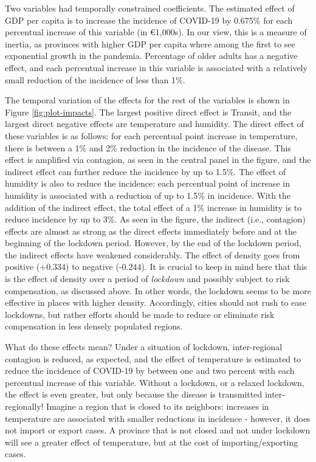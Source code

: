 \documentclass[]{elsarticle} %
\begin{document}
Two variables had temporally constrained coefficients. The estimated
effect of GDP per capita is to increase the incidence of COVID-19 by
0.675\% for each percentual increase of this variable (in €1,000s). In
our view, this is a measure of inertia, as provinces with higher GDP per
capita where among the first to see exponential growth in the pandemia.
Percentage of older adults has a negative effect, and each percentual
increase in this variable is associated with a relatively small
reduction of the incidence of less than 1\%.

The temporal variation of the effects for the rest of the variables is
shown in Figure \ref{fig:plot-impacts}. The largest positive direct
effect is Transit, and the largest direct negative effects are
temperature and humidity. The direct effect of these variables is as
follows: for each percentual point increase in temperature, there is
between a 1\% and 2\% reduction in the incidence of the disease. This
effect is amplified via contagion, as seen in the central panel in the
figure, and the indirect effect can further reduce the incidence by up
to 1.5\%. The effect of humidity is also to reduce the incidence: each
percentual point of increase in humidity is associated with a reduction
of up to 1.5\% in incidence. With the addition of the indirect effect,
the total effect of a 1\% increase in humidity is to reduce incidence by
up to 3\%. As seen in the figure, the indirect (i.e., contagion) effects
are almost as strong as the direct effects immediately before and at the
beginning of the lockdown period. However, by the end of the lockdown
period, the indirect effects have weakened considerably. The effect of
density goes from positive (+0.334) to negative (-0.244). It is crucial
to keep in mind here that this is the effect of density over a period of
\emph{lockdown} and possibly subject to risk compensation, as discussed
above. In other words, the lockdown seems to be more effective in places
with higher density. Accordingly, cities should not rush to ease
lockdowns, but rather efforts should be made to reduce or eliminate risk
compensation in less densely populated regions.

What do these effects mean? Under a situation of lockdown,
inter-regional contagion is reduced, as expected, and the effect of
temperature is estimated to reduce the incidence of COVID-19 by between
one and two percent with each percentual increase of this variable.
Without a lockdown, or a relaxed lockdown, the effect is even greater,
but only because the disease is transmitted inter-regionally! Imagine a
region that is closed to its neighbors: increases in temperature are
associated with smaller reductions in incidence - however, it does not
import or export cases. A province that is not closed and not under
lockdown will see a greater effect of temperature, but at the cost of
importing/exporting cases.
\end{document}
